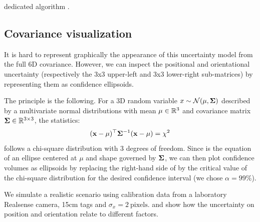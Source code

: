 dedicated algorithm \cite{collins2014infinitesimal}.

\subsection{Covariance visualization}

It is hard to represent graphically the appearance of this uncertainty model from the full 6D covariance. However, we can inspect the positional and 
orientational uncertainty (respectively the 3x3 upper-left and 3x3 lower-right sub-matrices) by representing them as confidence ellipsoids.

The principle is the following. For a 3D random variable $x \sim \mathcal{N}({\mu},{{\bm \Sigma}})$ described by a multivariate normal 
distributions with mean ${\bf\mu} \in \mathbb{R}^3$ and 
covariance matrix ${\bm \Sigma} \in \mathbb{R}^{3 \times 3}$, the statistics:
%
\begin{equation}
    ({\bf x} - {\bf\mu})^{\top} {\bm \Sigma}^{-1}({\bf x} - {\bf\mu}) = \chi^2
    \label{eq:chi2}
\end{equation}
%
follows a chi-square distribution with 3 degrees of freedom. Since  is the equation of an ellipse centered at $\mu$ and shape 
governed by ${\bm \Sigma}$, we can then plot confidence volumes as ellipsoids by replacing the right-hand side of  
 by the critical value of the chi-square distribution for the desired confidence interval (we chose $\alpha=99\%$). 

We simulate a realistic scenario using calibration data from a laboratory Realsense camera, 15cm tags and $\sigma_x = 2~\text{pixels}$. 
 and  show how the uncertainty on position and orientation relate to different factors.

